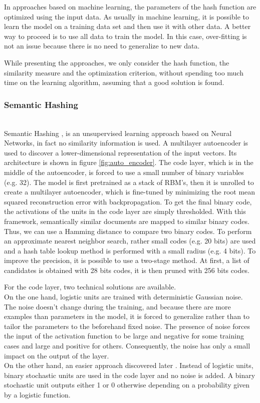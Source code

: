 In approaches based on machine learning, the parameters of the hash function are optimized using the input data. As usually in machine learning, it is possible to learn the model on a training data set and then use it with other data. A better way to proceed is to use all data to train the model. In this case, over-fitting is not an issue because there is no need to generalize to new data.

While presenting the approaches, we only consider the hash function, the similarity measure and the optimization criterion, without spending too much time on the learning algorithm, assuming that a good solution is found.

\subsubsection{Semantic Hashing}
~\\
Semantic Hashing \cite{salakhutdinov2007semantic},\cite{salakhutdinov2009semantic} is an unsupervised learning approach based on Neural Networks, in fact no similarity information is used. A multilayer autoencoder is used to discover a lower-dimensional representation of the input vectors. Its architecture is shown in figure \ref{fig:auto_encoder}. The code layer, which is in the middle of the autoencoder, is forced to use a small number of binary variables (e.g. 32). The model is first pretrained as a stack of RBM's, then it is unrolled to create a multilayer autoencoder, which is fine-tuned by minimizing the root mean squared reconstruction error with backpropagation. To get the final binary code, the activations of the units in the code layer are simply thresholded. With this framework, semantically similar documents are mapped to similar binary codes. Thus, we can use a Hamming distance to compare two binary codes. To perform an approximate nearest neighbor search, rather small codes (e.g. 20 bits) are used and a hash table lookup method is performed with a small radius (e.g. 4 bits). To improve the precision, it is possible to use a two-stage method. At first, a list of candidates is obtained with 28 bits codes, it is then pruned with 256 bits codes.

For the code layer, two technical solutions are available. \\
On the one hand, logistic units are trained with deterministic Gaussian noise. The noise doesn't change during the training, and because there are more examples than parameters in the model, it is forced to generalize rather than to tailor the parameters to the beforehand fixed noise. The presence of noise forces the input of the activation function to be large and negative for some training cases and large and positive for others. Consequently, the noise has only a small impact on the output of the layer. \\
On the other hand, an easier approach discovered later \cite{krizhevsky2011using}. Instead of logistic units, binary stochastic units are used in the code layer and no noise is added. A binary stochastic unit outputs either 1 or 0 otherwise depending on a probability given by a logistic function.

